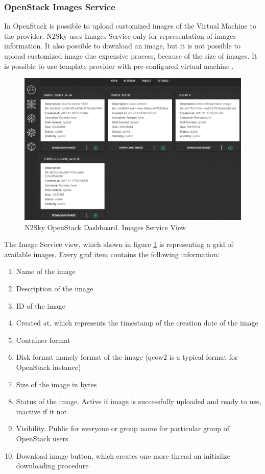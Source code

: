 \subsubsection{OpenStack Images Service}\label{OpenStack Images Service}

In OpenStack is possible to upload customized images of the Virtual Machine to the provider. N2Sky uses Images Service only for representation of images information. It also possible to download an image, but it is not possible to upload customized image due expensive process, because of the size of images. It is possible to use template provider with pre-configured virtual machine \cite{images}. 


\begin{figure}[H]
\begin{center}
  \includegraphics[width=\linewidth]{components/4/pics/openstack_images.png}
  \caption{N2Sky OpenStack Dashboard. Images Service View}
  \label{fig:openstack_images}
\end{center}
\end{figure}

The Image Service view, which shown in figure \ref{fig:openstack_images} is representing a grid of available images. Every grid item contains the following information: 
\begin{enumerate}
\item Name of the image
\item Description of the image
\item ID of the image
\item Created at, which represents the timestamp of the creation date of the image
\item Container format
\item Disk format namely format of the image (qcow2 is a typical format for OpenStack instance)
\item Size of the image in bytes
\item Status of the image. Active if image is successfully uploaded and ready to use, inactive if it not
\item Visibility. Public for everyone or group name for particular group of OpenStack users
\item Download image button, which creates one more thread an initialize downloading procedure
\end{enumerate}

